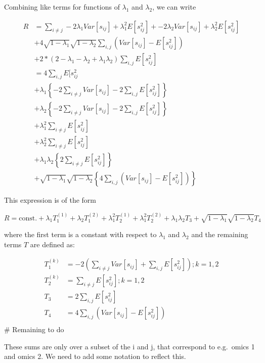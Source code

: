 \documentclass[
]{article}
\begin{document}
Combining like terms for functions of \(\lambda_1\) and \(\lambda_2\),
we can write

\[
\begin{aligned}
R &= \sum_{i \neq j}-2\lambda_1Var[s_{ij}] + \lambda_1^2E[s_{ij}^2]  + -2\lambda_2Var[s_{ij}] + \lambda_2^2E[s_{ij}^2] \\
& + 4\sqrt{1-\lambda_1}\sqrt{1-\lambda_2} \sum_{i,j}(Var[s_{ij}] - E[s_{ij}^2])  \\
& + 2*(2-\lambda_1 - \lambda_2 + \lambda_1\lambda_2)\sum_{i,j}E[s_{ij}^2] \\
& = 4 \sum_{i,j} E[s_{ij}^2 \\
& + \lambda_1 \left\{-2\sum_{i \neq j} Var[s_{ij}] - 2\sum_{i,j}E[s_{ij}^2]\right\} \\
& + \lambda_2 \left\{-2\sum_{i \neq j} Var[s_{ij}] - 2\sum_{i,j}E[s_{ij}^2]\right\} \\
& + \lambda_1^2\sum_{i \neq j}E[s_{ij}^2] \\
& + \lambda_2^2\sum_{i \neq j}E[s_{ij}^2] \\
& + \lambda_1\lambda_2\left\{2\sum_{i \neq j}E[s_{ij}^2]\right\} \\
& + \sqrt{1-\lambda_1}\sqrt{1-\lambda_2}\left\{4\sum_{i,j}(Var[s_{ij}] - E[s_{ij}^2])\right\}
\end{aligned}
\]

This expression is of the form

\[
R = \text{const.} + \lambda_1T_1^{(1)} + \lambda_2T_1^{(2)} + \lambda_1^2T_2^{(1)} + \lambda_1^2T_2^{(2)} + \lambda_1\lambda_2T_3 + \sqrt{1-\lambda_1}\sqrt{1-\lambda_2}T_4
\]

where the first term is a constant with respect to \(\lambda_1\) and
\(\lambda_2\) and the remaining terms \(T\) are defined as:

\[
\begin{aligned}
T_1^{(k)} &= -2\left(\sum_{i \neq j} Var[s_{ij}] + \sum_{i,j}E[s_{ij}^2]\right) ; k = 1,2 \\
T_2^{(k)} &= \sum_{i \neq j}E[s_{ij}^2] ; k = 1,2 \\
T_3 &= 2\sum_{i,j}E[s_{ij}^2] \\
T_4 &= 4\sum_{i,j}(Var[s_{ij}] - E[s_{ij}^2]) \\
\end{aligned}
\] \# Remaining to do

These sums are only over a subset of the i and j, that correspond to
e.g.~omics 1 and omics 2. We need to add some notation to reflect this.
\end{document}
